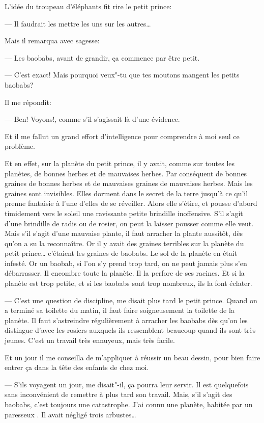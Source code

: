 \begin{Parallel}[p]{}{}
{L'idée du troupeau d'éléphants fit rire le petit
prince:

--- Il faudrait les mettre les uns sur les autres\ldots{}

Mais il remarqua avec sagesse:

--- Les baobabs, avant de grandir, ça commence par
être petit.

--- C'est exact! Mais pourquoi veux"-tu que tes
moutons mangent les petits baobabs?

Il me répondit:

--- Ben! Voyons!, comme s'il s'agissait là d'une évidence.

Et il me fallut un grand effort d'intelligence pour comprendre à moi seul ce problème.

Et en effet, sur la planète du petit prince, il y
avait, comme sur toutes les planètes, de bonnes herbes et de mauvaises herbes. Par conséquent de bonnes graines de bonnes herbes et de mauvaises graines de mauvaises herbes. Mais les graines sont
invisibles. Elles dorment dans le secret de la terre
jusqu'à ce qu'il prenne fantaisie à l'une d'elles de se
réveiller. Alors elle s'étire, et pousse d'abord timidement vers le soleil une ravissante petite brindille
inoffensive. S'il s'agit d'une brindille de radis ou de
rosier, on peut la laisser pousser comme elle veut.
Mais s'il s'agit d'une mauvaise plante, il faut arracher la plante aussitôt, dès qu'on a su la reconnaître. Or il y avait des graines terribles sur la planète du petit prince\ldots{} c'étaient les graines de
baobabs. Le sol de la planète en était infesté. Or un
baobab, si l'on s'y prend trop tard, on ne peut
jamais plus s'en débarrasser. Il encombre toute la
planète. Il la perfore de ses racines. Et si la planète
est trop petite, et si les baobabs sont trop nombreux,
ils la font éclater.

--- C'est une question de discipline, me disait plus
tard le petit prince. Quand on a terminé sa toilette
du matin, il faut faire soigneusement la toilette de la
planète. Il faut s'astreindre régulièrement à arracher les baobabs dès qu'on les distingue d'avec les
rosiers auxquels ils ressemblent beaucoup quand ils
sont très jeunes. C'est un travail très ennuyeux, mais
très facile.

Et un jour il me conseilla de m'appliquer à réussir
un beau dessin, pour bien faire entrer ça dans la tête
des enfants de chez moi.

--- S'ils voyagent un jour, me disait"-il, ça pourra leur servir. Il est quelquefois sans
inconvénient de remettre à plus tard son travail.
Mais, s'il s'agit des baobabs, c'est toujours une catastrophe. J'ai connu une planète, habitée par un paresseux . Il avait négligé trois arbustes\ldots{}

}
\end{Parallel}
